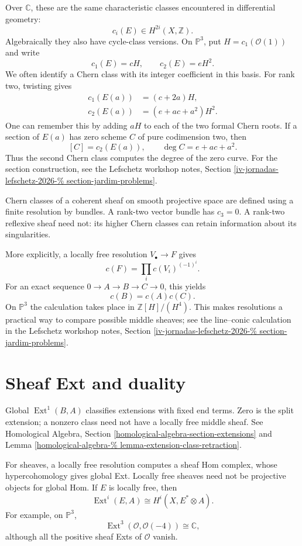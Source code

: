 Over $\mathbb{C}$, these are the same
characteristic classes encountered in
differential geometry:
$$
c_i(E)\in H^{2i}(X,\mathbb{Z}).
$$
Algebraically they also have cycle-class
versions. On $\mathbb{P}^3$, put
$H=c_1(\mathcal{O}(1))$ and write
$$
c_1(E)=cH,\qquad c_2(E)=eH^2.
$$
We often identify a Chern class with
its integer coefficient in this basis.
For rank two, twisting gives
$$
\begin{aligned}
c_1(E(a))&=(c+2a)H,\\
c_2(E(a))&=(e+ac+a^2)H^2.
\end{aligned}
$$
One can remember this by adding $aH$
to each of the two formal Chern roots.
If a section of $E(a)$ has zero scheme
$C$ of pure codimension two, then
$$
[C]=c_2(E(a)),\qquad
\deg C=e+ac+a^2.
$$
Thus the second Chern class computes
the degree of the zero curve.
For the section construction, see the
Lefschetz workshop notes, Section
\ref{iv-jornadas-lefschetz-2026-%
section-jardim-problems}.

Chern classes of a coherent sheaf on
smooth projective space are defined
using a finite resolution by bundles.
A rank-two vector bundle has $c_3=0$.
A rank-two reflexive sheaf need not:
its higher Chern classes can retain
information about its singularities.

More explicitly, a locally free resolution
$V_\bullet\to F$ gives
$$
c(F)=\prod_i c(V_i)^{(-1)^i}.
$$
For an exact sequence
$0\to A\to B\to C\to0$, this yields
$$
c(B)=c(A)c(C).
$$
On $\mathbb{P}^3$ the calculation takes
place in $\mathbb{Z}[H]/(H^4)$.
This makes resolutions a practical way
to compare possible middle sheaves;
see the line--conic calculation in the
Lefschetz workshop notes, Section
\ref{iv-jornadas-lefschetz-2026-%
section-jardim-problems}.

\section{Sheaf Ext and duality}
\label{section-sheaf-ext-duality}

Global $\operatorname{Ext}^1(B,A)$
classifies extensions with fixed end
terms. Zero is the split extension;
a nonzero class need not have a locally
free middle sheaf. See Homological
Algebra, Section
\ref{homological-algebra-section-extensions}
and Lemma
\ref{homological-algebra-%
lemma-extension-class-retraction}.

For sheaves, a locally free resolution
computes a sheaf Hom complex, whose
hypercohomology gives global Ext.
Locally free sheaves need not be
projective objects for global Hom.
If $E$ is locally free, then
$$
\operatorname{Ext}^i(E,A)
\cong H^i(X,E^*\otimes A).
$$
For example, on $\mathbb{P}^3$,
$$
\operatorname{Ext}^3
(\mathcal{O},\mathcal{O}(-4))
\cong\mathbb{C},
$$
although all the positive sheaf Exts
of $\mathcal{O}$ vanish.

